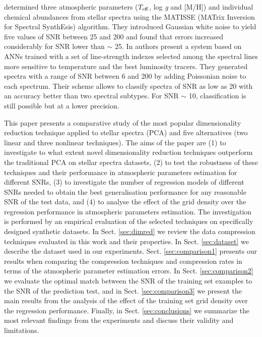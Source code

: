 \documentclass[a4paper,fleqn,usenatbib]{mnras}
\begin{document}
\cite{recio:06} determined three atmospheric parameters
($T_{\rm eff}$, log \textit{g} and [M/H]) and individual chemical
abundances from stellar spectra using the MATISSE (MATrix
Inversion for Spectral SynthEsis) algorithm. They introduced Gaussian
white noise to yield five values of SNR between 25 and 200 and found
that errors increased considerably for SNR lower than $\sim$ 25.  In
\cite{navarro:12} authors present a system based on ANNs trained with
a set of line-strength indexes selected among the spectral lines more
sensitive to temperature and the best luminosity tracers. They
generated spectra with a range of SNR between 6 and 200 by adding
Poissonian noise to each spectrum. Their scheme allows to classify
spectra of SNR as low as 20 with an accuracy better than two spectral
subtypes. For SNR $\sim$ 10, classification is still possible but at a
lower precision.

This paper presents a comparative study of the most popular
dimensionality reduction technique applied to stellar spectra (PCA)
and five alternatives (two linear and three nonlinear techniques). The
aims of the paper are (1) to investigate to what extent novel
dimensionality reduction techniques outperform the traditional PCA on
stellar spectra datasets, (2) to test the robustness of these
techniques and their performance in atmospheric parameters estimation
for different SNRs, (3) to investigate the number of regression models
of different SNRs needed to obtain the best generalisation performance
for any reasonable SNR of the test data, and (4) to analyse the effect
of the grid density over the regression performance in atmospheric
parameters estimation.  The investigation is performed by an empirical
evaluation of the selected techniques on specifically designed
synthetic datasets. In Sect. \ref{sec:dimred} we review the data compression
techniques evaluated in this work and their properties. In
Sect. \ref{sec:dataset} we describe the dataset used in our experiments. 
Sect. \ref{sec:comparison1} presents our results when comparing the 
compression techniques and compression rates in terms of the atmospheric 
parameter estimation errors. In Sect. \ref{sec:comparison2} we evaluate 
the optimal match between the SNR of the training set examples to the SNR 
of the prediction test, and in Sect. \ref{sec:comparison3} we present 
the main results from the analysis of the effect of the training set grid 
density over the regression performance. Finally, in Sect. 
\ref{sec:conclusions} we summarize the most relevant findings from 
the experiments and discuss their validity and limitations.
\end{document}
